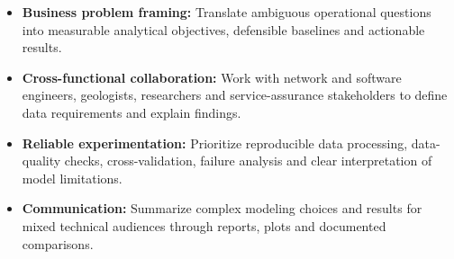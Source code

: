 \documentclass[9pt,letterpaper]{extarticle}
\begin{document}
\begin{itemize}
\item \textbf{Business problem framing:} Translate ambiguous operational questions into measurable analytical objectives, defensible baselines and actionable results.
\item \textbf{Cross-functional collaboration:} Work with network and software engineers, geologists, researchers and service-assurance stakeholders to define data requirements and explain findings.
\item \textbf{Reliable experimentation:} Prioritize reproducible data processing, data-quality checks, cross-validation, failure analysis and clear interpretation of model limitations.
\item \textbf{Communication:} Summarize complex modeling choices and results for mixed technical audiences through reports, plots and documented comparisons.
\end{itemize}
\end{document}
